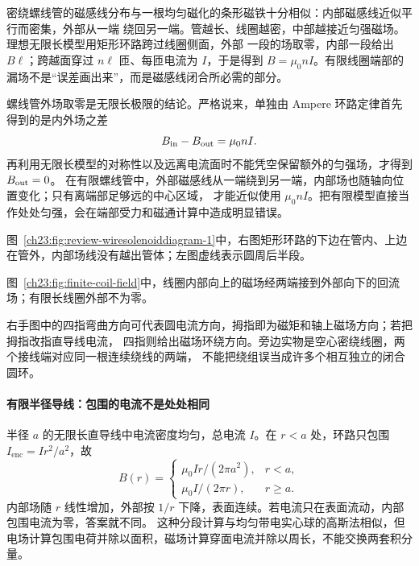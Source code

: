 密绕螺线管的磁感线分布与一根均匀磁化的条形磁铁十分相似：内部磁感线近似平行而密集，外部从一端
绕回另一端。管越长、线圈越密，中部越接近匀强磁场。理想无限长模型用矩形环路跨过线圈侧面，外部
一段的场取零，内部一段给出 $B\ell$；跨越面穿过 $n\ell$ 匝、每匝电流为 $I$，于是得到
$B=\mu_0nI$。有限线圈端部的漏场不是“误差画出来”，而是磁感线闭合所必需的部分。

螺线管外场取零是无限长极限的结论。严格说来，单独由 Ampere 环路定律首先得到的是内外场之差
\begin{equation}
  B_{\rm in}-B_{\rm out}=\mu_0nI.
\end{equation}
再利用无限长模型的对称性以及远离电流面时不能凭空保留额外的匀强场，才得到 $B_{\rm out}=0$。
在有限螺线管中，外部磁感线从一端绕到另一端，内部场也随轴向位置变化；只有离端部足够远的中心区域，
才能近似使用 $\mu_0nI$。把有限模型直接当作处处匀强，会在端部受力和磁通计算中造成明显错误。

图~\ref{ch23:fig:review-wiresolenoiddiagram-1}中，右图矩形环路的下边在管内、上边在管外，内部场线没有越出管体；左图虚线表示圆周后半段。
\par\noindent\begin{minipage}{\linewidth}
\wireSolenoidDiagram
{}\label{ch23:fig:review-wiresolenoiddiagram-1}
\end{minipage}\par\medskip

图~\ref{ch23:fig:finite-coil-field}中，线圈内部向上的磁场经两端接到外部向下的回流场；有限长线圈外部不为零。
\par\noindent\begin{minipage}{\linewidth}
\finiteCoilFieldDiagram
{}\label{ch23:fig:finite-coil-field}
\end{minipage}\par\medskip
\handSolenoidContext
右手图中的四指弯曲方向可代表圆电流方向，拇指即为磁矩和轴上磁场方向；若把拇指改指直导线电流，
四指则给出磁场环绕方向。旁边实物是空心密绕线圈，两个接线端对应同一根连续绕线的两端，
不能把绕组误当成许多个相互独立的闭合圆环。


\paragraph{有限半径导线：包围的电流不是处处相同}
半径 $a$ 的无限长直导线中电流密度均匀，总电流 $I$。在 $r<a$ 处，环路只包围
$I_{\mathrm{enc}}=I r^2/a^2$，故
\[
 B(r)=\begin{cases}\mu_0Ir/(2\pi a^2),&r<a,\\
 \mu_0I/(2\pi r),&r\ge a.
 \end{cases}
\]
内部场随 $r$ 线性增加，外部按 $1/r$ 下降，表面连续。若电流只在表面流动，内部包围电流为零，答案就不同。
这种分段计算与均匀带电实心球的高斯法相似，但电场计算包围电荷并除以面积，磁场计算穿面电流并除以周长，不能交换两套积分量。

